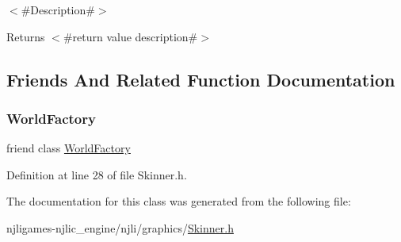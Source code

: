 $<$\#\+Description\#$>$

\begin{DoxyReturn}{Returns}
$<$\#return value description\#$>$ 
\end{DoxyReturn}


\subsection{Friends And Related Function Documentation}
\mbox{\label{classnjli_1_1_skinner_acb96ebb09abe8f2a37a915a842babfac}} 
\subsubsection{\texorpdfstring{World\+Factory}{WorldFactory}}
{\footnotesize\ttfamily friend class \mbox{\hyperlink{classnjli_1_1_world_factory}{World\+Factory}}\hspace{0.3cm}{\ttfamily [friend]}}



Definition at line 28 of file Skinner.\+h.



The documentation for this class was generated from the following file\+:\begin{DoxyCompactItemize}
\item 
njligames-\/njlic\+\_\+engine/njli/graphics/\mbox{\hyperlink{_skinner_8h}{Skinner.\+h}}\end{DoxyCompactItemize}
